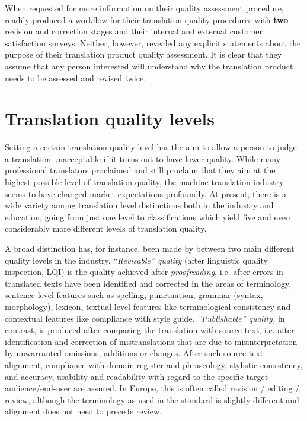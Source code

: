 \documentclass[output=paper]{langsci/langscibook}
\begin{document}
When requested for more information on their quality assessment procedure, \citeauthor{SCTAn.d.} readily produced a workflow for their translation quality procedures with \textbf{two} revision and correction stages and their internal and external customer satisfaction surveys. Neither, however, revealed any explicit statements about the purpose of their translation product quality assessment. It is clear that they assume that any person interested will understand why the translation product needs to be assessed and revised twice. 

\section{Translation quality levels}\label{sec:vandepitte:3}

Setting a certain translation quality level has the aim to allow a person to judge a translation unacceptable if it turns out to have lower quality. While many professional translators proclaimed and still proclaim that they aim at the highest possible level of translation quality, the machine translation industry seems to have changed market expectations profoundly. At present, there is a wide variety among translation level distinctions both in the industry and education, going from just one level to classifications which yield five and even considerably more different levels of translation quality.

A broad distinction has, for instance, been made by \citet{Williams2004} between two main different quality levels in the industry. ``\textit{Revisable'' quality} (after linguistic quality inspection, LQI) is the quality achieved after \textit{proofreading}, i.e. after errors in translated texts have been identified and corrected in the areas of terminology, sentence level features such as spelling, punctuation, grammar (syntax, morphology), lexicon, textual level features like terminological consistency and contextual features like compliance with style guide. \textit{''Publishable'' quality,} in contrast, is produced after comparing the translation with source text, i.e. after identification and correction of mistranslations that are due to misinterpretation by unwarranted omissions, additions or changes. After such source text alignment, compliance with domain register and phraseology, stylistic consistency, and accuracy, usability and readability with regard to the specific target audience/end-user are assured. In Europe, this is often called revision / editing / review, although the terminology as used in the \citet{ISO2015} standard is slightly different and alignment does not need to precede review.
\end{document}
